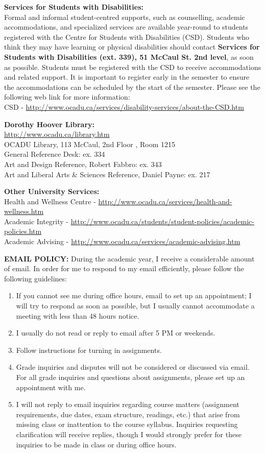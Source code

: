\documentclass[10pt]{article}
\begin{document}
\textbf{Services for Students with Disabilities:}\\
Formal and informal student-centred supports, such as counselling, academic accommodations, and specialized services are available year-round to students registered with the Centre for Students with Disabilities (CSD). Students who think they may have learning or physical disabilities should contact \textbf{Services for Students with Disabilities (ext. 339), 51 McCaul St. 2nd level}, as soon as possible. Students must be registered with the CSD to receive accommodations and related support. It is important to register early in the semester to ensure the accommodations can be scheduled by the start of the semester.  Please see the following web link for more information:\\ CSD - \url{http://www.ocadu.ca/services/disability-services/about-the-CSD.htm} 

\textbf{Dorothy Hoover Library:}\\
\url{http://www.ocadu.ca/library.htm} \\
OCADU Library, 113 McCaul, 2nd Floor , Room 1215 \\
General Reference Desk: ex. 334 \\
Art and Design Reference, Robert Fabbro: ex. 343 \\
Art and Liberal Arts \& Sciences Reference, Daniel Payne: ex. 217 

\textbf{Other University Services:}\\
Health and Wellness Centre - \url{http://www.ocadu.ca/services/health-and-wellness.htm} \\
Academic Integrity - \url{http://www.ocadu.ca/students/student-policies/academic-policies.htm} \\
Academic Advising - \url{http://www.ocadu.ca/services/academic-advising.htm} 

\textbf{EMAIL POLICY:} 
During the academic year, I receive a considerable amount of email. In order for me to respond to my email efficiently, please follow the following guidelines:
\begin{enumerate}[nosep]
	\item If you cannot see me during office hours, email to set up an appointment; I will try to respond as soon as possible, but I usually cannot accommodate a meeting with less than 48 hours notice.
	\item I usually do not read or reply to email after 5 PM or weekends. 
	\item Follow instructions for turning in assignments. 
	\item Grade inquiries and disputes will not be considered or discussed via email. For all grade inquiries and questions about assignments, please set up an appointment with me. 
	\item I will not reply to email inquiries regarding course matters (assignment requirements, due dates, exam structure, readings, etc.) that arise from missing class or inattention to the course syllabus. Inquiries requesting clarification will receive replies, though I would strongly prefer for these inquiries to be made in class or during office hours.
\end{enumerate}
\end{document}
